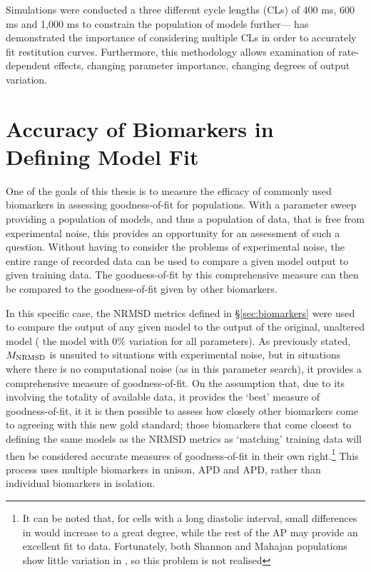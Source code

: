 \documentclass[../thesis-main.tex]{subfiles}
\begin{document}
Simulations were conducted a three different cycle lengths (CLs) of 400 ms, 600 ms and 1,000 ms to constrain the population of models further---\citet{Syed2005} has demonstrated the importance of considering multiple CLs in order to accurately fit restitution curves. Furthermore, this methodology allows examination of rate-dependent effects, \eg{} changing parameter importance, changing degrees of output variation.

\section{Accuracy of Biomarkers in Defining Model Fit}
\label{sec:biomarker-accuracy}
One of the goals of this thesis is to measure the efficacy of commonly used biomarkers in assessing goodness-of-fit for populations. With a parameter sweep providing a population of models, and thus a population of data, that is free from experimental noise, this provides an opportunity for an assessment of such a question. Without having to consider the problems of experimental noise, the entire range of recorded data can be used to compare a given model output to given training data. The goodness-of-fit by this comprehensive measure can then be compared to the goodness-of-fit given by other biomarkers.

In this specific case, the NRMSD metrics defined in \S\ref{sec:biomarkers} were used to compare the output of any given model to the output of the original, unaltered model (\idest{} the model with $0\%$ variation for all parameters). As previously stated, $M_\textnormal{NRMSD}$ is unsuited to situations with experimental noise, but in situations where there is no computational noise (as in this parameter search), it provides a comprehensive measure of goodness-of-fit. On the assumption that, due to its involving the totality of available data, it provides the `best' measure of goodness-of-fit, it it is then possible to assess how closely other biomarkers come to agreeing with this new gold standard; those biomarkers that come closest to defining the same models as the NRMSD metrics as `matching' training data will then be considered accurate measures of goodness-of-fit in their own right.\footnote{It can be noted that, for cells with a long diastolic interval, small differences in \vrest{} would increase \aprms{} to a great degree, while the rest of the AP may provide an excellent fit to data. Fortunately, both Shannon and Mahajan populations show little variation in \vrest{}, so this problem is not realised} This process uses multiple biomarkers in unison, \eg{} APD and APD, rather than individual biomarkers in isolation.
\end{document}
